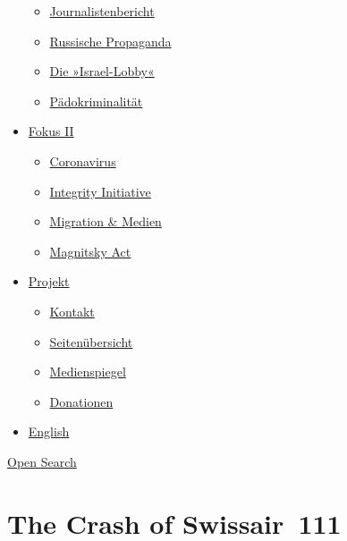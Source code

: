 \begin{itemize}
  \begin{itemize}
  \tightlist
  \item
    \href{https://swprs.org/bericht-eines-journalisten/}{Journalistenbericht}
  \item
    \href{https://swprs.org/russische-propaganda/}{Russische Propaganda}
  \item
    \href{https://swprs.org/die-israel-lobby-fakten-und-mythen/}{Die
    »Israel-Lobby«}
  \item
    \href{https://swprs.org/geopolitik-und-paedokriminalitaet/}{Pädokriminalität}
  \end{itemize}
\item
  \href{https://swprs.org/migration-und-medien/}{Fokus II}

  \begin{itemize}
  \tightlist
  \item
    \href{https://swprs.org/covid-19-hinweis-ii/}{Coronavirus}
  \item
    \href{https://swprs.org/die-integrity-initiative/}{Integrity
    Initiative}
  \item
    \href{https://swprs.org/migration-und-medien/}{Migration \& Medien}
  \item
    \href{https://swprs.org/der-fall-magnitsky/}{Magnitsky Act}
  \end{itemize}
\item
  \href{https://swprs.org/kontakt/}{Projekt}

  \begin{itemize}
  \tightlist
  \item
    \href{https://swprs.org/kontakt/}{Kontakt}
  \item
    \href{https://swprs.org/uebersicht/}{Seitenübersicht}
  \item
    \href{https://swprs.org/medienspiegel/}{Medienspiegel}
  \item
    \href{https://swprs.org/donationen/}{Donationen}
  \end{itemize}
\item
  \href{https://swprs.org/contact/}{English}
\end{itemize}

\protect\hyperlink{}{Open Search}

\hypertarget{the-crash-of-swissair-111}{%
\section{The Crash of Swissair~111}\label{the-crash-of-swissair-111}}

